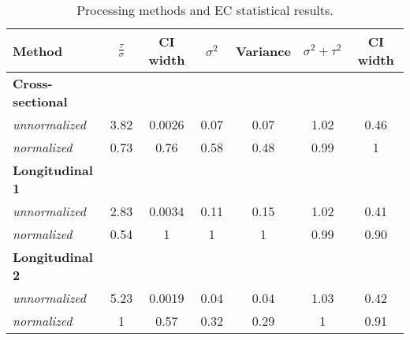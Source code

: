 
\begin{table}[h!]
\centering
\caption{Processing methods and EC statistical results.}
\begin{tabular*}{0.77\textwidth}{@{\extracolsep{\fill}} lcc|cc|cc}
\hline
Method & $\frac{\tau}{\sigma}$ & CI width& $\sigma^2$ & Variance& $\sigma^2 + \tau^2$ & CI width \\
\hline
\bf{Cross-sectional} &&&&&& \\
\quad \emph{unnormalized} & 3.82 & 0.0026  & 0.07 & 0.07 & 1.02 & \cellcolor{red} 0.46  \\
\quad \emph{normalized}   & 0.73 & 0.76  & 0.58 & 0.48 & 0.99 & \cellcolor{red} 1 \\
\bf{Longitudinal 1} &&&&&& \\
\quad \emph{unnormalized}  & \cellcolor{red} 2.83 & \cellcolor{red} 0.0034 & \cellcolor{red} 0.11 &\cellcolor{red} 0.15 & \cellcolor{green} 1.02 & \cellcolor{green} 0.41 \\
\quad \emph{normalized}   & \cellcolor{red} 0.54 & \cellcolor{red} 1 &\cellcolor{red} 1 &\cellcolor{red} 1 & \cellcolor{green} 0.99 & \cellcolor{green} 0.90 \\
\bf{Longitudinal 2} &&&&&& \\
 \quad \emph{unnormalized}  & \cellcolor{green} 5.23 & \cellcolor{green} 0.0019 & \cellcolor{green} 0.04 & \cellcolor{green} 0.04 & \cellcolor{red} 1.03 & 0.42 \\
 \quad \emph{normalized}   & \cellcolor{green} 1 & \cellcolor{green} 0.57 & \cellcolor{green} 0.32 & \cellcolor{green} 0.29 & \cellcolor{red} 1 & 0.91 \\
\hline
\end{tabular*}
\label{table:res_tab}
\end{table}
